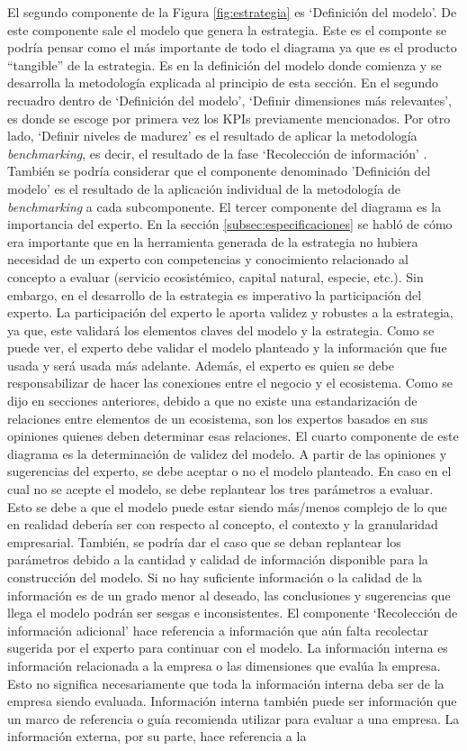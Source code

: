 El segundo componente de la Figura \ref{fig:estrategia} es ‘Definición del modelo’. De este componente sale el modelo que genera la estrategia. Este es el componte se podría pensar como el más importante de todo el diagrama ya que es el producto “tangible” de la estrategia. Es en la definición del modelo donde comienza y se desarrolla la metodología explicada al principio de esta sección. En el segundo recuadro dentro de ‘Definición del modelo’, ‘Definir dimensiones más relevantes’, es donde se escoge por primera vez los KPIs previamente mencionados.  Por otro lado, ‘Definir niveles de madurez’ es el resultado de aplicar la metodología \textit{benchmarking}, es decir, el resultado de la fase ‘Recolección de información’ . También se podría considerar que el componente denominado 'Definición del modelo' es el resultado de la aplicación individual de la metodología de \textit{benchmarking} a cada subcomponente. El tercer componente del diagrama es la importancia del experto. En la sección \ref{subsec:especificaciones}  se habló de cómo era importante que en la herramienta generada de la estrategia no hubiera necesidad de un experto con competencias y conocimiento relacionado al concepto a evaluar (servicio ecosistémico, capital natural, especie, etc.). Sin embargo, en el desarrollo de la estrategia es imperativo la participación del experto. La participación del experto le aporta validez y robustes a la estrategia, ya que, este validará los elementos claves del modelo y la estrategia. Como se puede ver, el experto debe validar el modelo planteado y la información que fue usada y será usada más adelante. Además, el experto es quien se debe responsabilizar de hacer las conexiones entre el negocio y el ecosistema. Como se dijo en secciones anteriores, debido a que no existe una estandarización de relaciones entre elementos de un ecosistema, son los expertos basados en sus opiniones quienes deben determinar esas relaciones. El cuarto componente de este diagrama es la determinación de validez del modelo. A partir de las opiniones y sugerencias del experto, se debe aceptar o no el modelo planteado. En caso en el cual no se acepte el modelo, se debe replantear los tres parámetros a evaluar. Esto se debe a que el modelo puede estar siendo más/menos complejo de lo que en realidad debería ser con respecto al concepto, el contexto y la granularidad empresarial. También, se podría dar el caso que se deban replantear los parámetros debido a la cantidad y calidad de información disponible para la construcción del modelo. Si no hay suficiente información o la calidad de la información es de un grado menor al deseado, las conclusiones y sugerencias que llega el modelo podrán ser sesgas e inconsistentes. El componente ‘Recolección de información adicional’ hace referencia a información que aún falta recolectar sugerida por el experto para continuar con el modelo. La información interna es información relacionada a la empresa o las dimensiones que evalúa la empresa. Esto no significa necesariamente que toda la información interna deba ser de la empresa siendo evaluada. Información interna también puede ser información que un marco de referencia o guía recomienda utilizar para evaluar a una empresa. La información externa, por su parte, hace referencia a la 